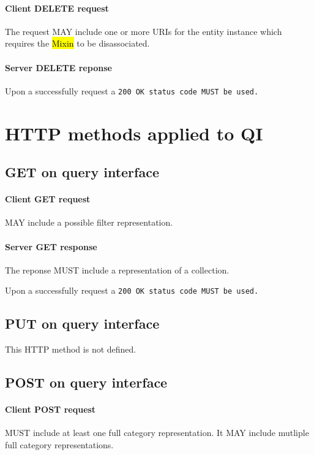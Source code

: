 \documentclass[10pt,a4paper]{article}
\begin{document}
\paragraph{Client DELETE request}
The request MAY include one or more URIs for the entity instance which requires the \hl{Mixin} to be disassociated.

\paragraph{Server DELETE reponse}
Upon a successfully request a \tt{200 OK} status code MUST be used.

\section{HTTP methods applied to QI}

\subsection{GET on query interface}

\paragraph{Client GET request}
MAY include a possible filter representation.

\paragraph{Server GET response}
The reponse MUST include a representation of a collection.

Upon a successfully request a \tt{200 OK} status code MUST be used.

\subsection{PUT on query interface}

This HTTP method is not defined.

\subsection{POST on query interface}

\paragraph{Client POST request}
MUST include at least one full category representation. It MAY include mutliple full category representations.
\end{document}
